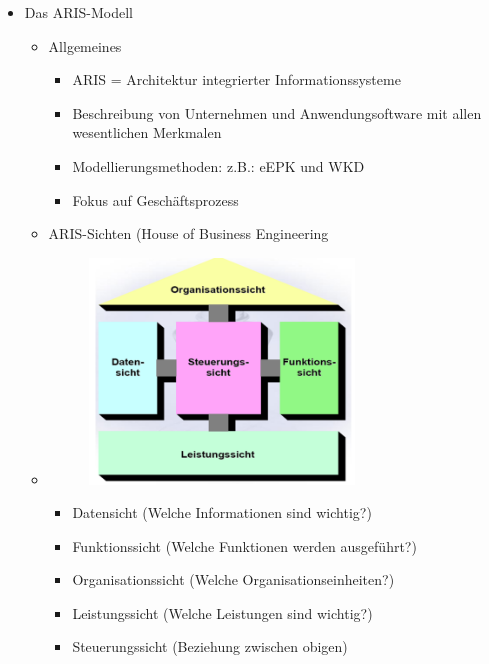 \documentclass[11pt,a4paper]{article}
\begin{document}
\begin{itemize}
	\item Das ARIS-Modell
		\begin{itemize}
		\item Allgemeines
			\begin{itemize}
			\item ARIS = Architektur integrierter Informationssysteme
			\item Beschreibung von Unternehmen und Anwendungsoftware mit allen wesentlichen Merkmalen
			\item Modellierungsmethoden: z.B.: eEPK und WKD 
			\item Fokus auf Geschäftsprozess
			\end{itemize}
		
		\item ARIS-Sichten (House of Business Engineering
		\item[] \begin{minipage}{0.35\textwidth}
				\begin{figure}[H]
				\includegraphics[height=6cm]{Bilder/arishaus}
				
				\end{figure}
			\end{minipage}
			\begin{minipage}[t]{0.55\textwidth}
				\vspace{-1.5cm}
				\begin{itemize}
				\item Datensicht (Welche Informationen sind wichtig?)
				\item Funktionssicht (Welche Funktionen werden ausgeführt?)
				\item Organisationssicht (Welche Organisationseinheiten?)
				\item Leistungssicht (Welche Leistungen sind wichtig?)
				\item Steuerungssicht (Beziehung zwischen obigen)
				\end{itemize}
			\end{minipage}
			

\end{itemize}
\end{itemize}
\end{document}
